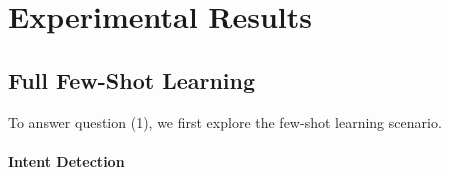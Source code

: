 \section{Experimental Results}
\label{sec:experiments}

\subsection{Full Few-Shot Learning}
To answer question (1), we first explore the few-shot learning scenario.

\paragraph{Intent Detection}

\begin{table*}
\setlength{\tabcolsep}{0.23em}
\centering
\small{
\begin{tabular}{|c|c|c|c|c|c|c|c|}


\end{tabular}}
\end{table*}
